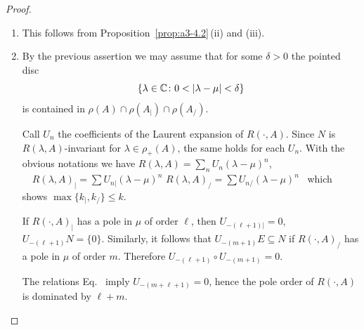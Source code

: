 \begin{proof}
\begin{enumerate}[\upshape (i), wide, labelindent=.25em]
\item 
This follows from Proposition~\ref{prop:a3-4.2}\,(ii) and (iii).

\item 
By the previous assertion we may assume that for some $\delta > 0$ the pointed disc
\[
\{\lambda \in \mathbb{C} \colon 0 < |\lambda-\mu| < \delta\}
\]
is contained in $\rho(A) \cap \rho(A_{|}) \cap \rho(A_{/})$.

Call $U_{n}$ the coefficients of the Laurent expansion of\/ $R(\cdot,A)$.
Since $N$ is $R(\lambda,A)$-invariant for $\lambda \in \rho_{+}(A)$, the same holds for each $U_{n}$.
With the obvious notations we have \quad
$R(\lambda,A) = \sum_{n} U_{n}(\lambda-\mu)^{n}$, $\quad R(\lambda,A)_{|} = \sum U_{n|}(\lambda-\mu)^{n}$ \quad {} \quad $R(\lambda,A)_{/} = \sum U_{n/}(\lambda-\mu)^{n}$~
which shows $\max\{k_{|},k_{/}\} \leq k$.

If\/ $R(\cdot,A)_{|}$ has a pole in $\mu$ of order $\ell$, then $U_{-(\ell+1)|} = 0$, \ie $U_{-(\ell+1)}N = \{0\}$.
Similarly, it follows that $U_{-(m+1)}E \subseteq N$ if\/ $R(\cdot,A)_{/}$ has a pole in $\mu$ of order $m$.
Therefore $U_{-(\ell+1)} \circ U_{-(m+1)} = 0$.

The relations Eq.~ imply $U_{-(m+\ell+1)} = 0$, hence the pole order of\/ $R(\cdot,A)$ is dominated by $\ell + m$.
\qedhere
\end{enumerate}
\end{proof}
